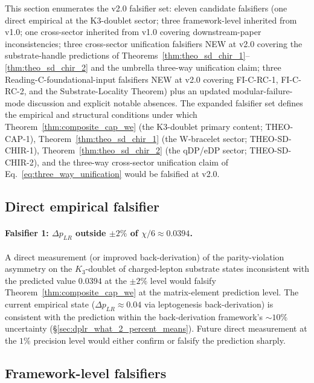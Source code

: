 \documentclass[11pt,letterpaper]{article}
\newcommand{\Kthree}{\ensuremath{K_3}}
\newcommand{\DeltapLR}{\Delta p_{LR}}
\begin{document}
This section enumerates the v2.0 falsifier set: eleven candidate falsifiers (one direct empirical at the K3-doublet sector; three framework-level inherited from v1.0; one cross-sector inherited from v1.0 covering downstream-paper inconsistencies; three cross-sector unification falsifiers NEW at v2.0 covering the substrate-handle predictions of Theorems~\ref{thm:theo_sd_chir_1}--\ref{thm:theo_sd_chir_2} and the umbrella three-way unification claim; three Reading-C-foundational-input falsifiers NEW at v2.0 covering FI-C-RC-1, FI-C-RC-2, and the Substrate-Locality Theorem) plus an updated modular-failure-mode discussion and explicit notable absences. The expanded falsifier set defines the empirical and structural conditions under which Theorem~\ref{thm:composite_cap_we} (the K3-doublet primary content; THEO-CAP-1), Theorem~\ref{thm:theo_sd_chir_1} (the W-bracelet sector; THEO-SD-CHIR-1), Theorem~\ref{thm:theo_sd_chir_2} (the qDP/eDP sector; THEO-SD-CHIR-2), and the three-way cross-sector unification claim of Eq.~\eqref{eq:three_way_unification} would be falsified at v2.0.

\subsection{Direct empirical falsifier}\label{sec:falsifier_empirical}

\paragraph{Falsifier 1: $\DeltapLR$ outside $\pm 2\%$ of $\chi/6 \approx 0.0394$.}
A direct measurement (or improved back-derivation) of the parity-violation asymmetry on the $\Kthree$-doublet of charged-lepton substrate states inconsistent with the predicted value $0.0394$ at the $\pm 2\%$ level would falsify Theorem~\ref{thm:composite_cap_we} at the matrix-element prediction level. The current empirical state ($\DeltapLR \approx 0.04$ via leptogenesis back-derivation) is consistent with the prediction within the back-derivation framework's $\sim 10\%$ uncertainty (\S\ref{sec:dplr_what_2_percent_means}). Future direct measurement at the $1\%$ precision level would either confirm or falsify the prediction sharply.

\subsection{Framework-level falsifiers}\label{sec:falsifier_framework}
\end{document}
